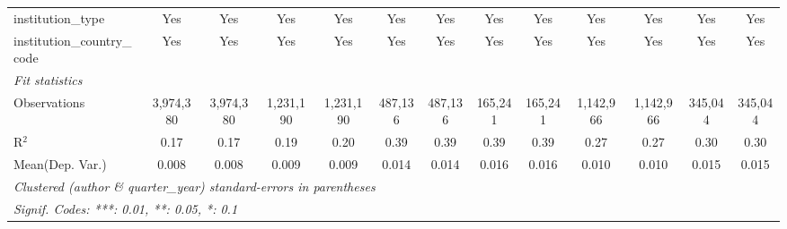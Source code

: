 \begin{tabular}{lcccccccccccc}
   institution\_type                        & Yes            & Yes            & Yes            & Yes            & Yes            & Yes             & Yes            & Yes            & Yes            & Yes            & Yes            & Yes\\  
   institution\_country\_code               & Yes            & Yes            & Yes            & Yes            & Yes            & Yes             & Yes            & Yes            & Yes            & Yes            & Yes            & Yes\\  
   \midrule
   \emph{Fit statistics}\\
   Observations                             & 3,974,380      & 3,974,380      & 1,231,190      & 1,231,190      & 487,136        & 487,136         & 165,241        & 165,241        & 1,142,966      & 1,142,966      & 345,044        & 345,044\\  
   R$^2$                                    & 0.17           & 0.17           & 0.19           & 0.20           & 0.39           & 0.39            & 0.39           & 0.39           & 0.27           & 0.27           & 0.30           & 0.30\\  
Mean(Dep. Var.) & 0.008 & 0.008 & 0.009 & 0.009 & 0.014 & 0.014 & 0.016 & 0.016 & 0.010 & 0.010 & 0.015 & 0.015 \\
   \midrule \midrule
   \multicolumn{13}{l}{\emph{Clustered (author \& quarter\_year) standard-errors in parentheses}}\\
   \multicolumn{13}{l}{\emph{Signif. Codes: ***: 0.01, **: 0.05, *: 0.1}}\\
\end{tabular}
\par\endgroup

